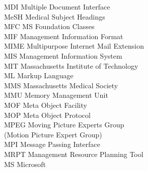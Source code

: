 \begin{tabbing}
    \>MDI \>\>Multiple Document Interface\\

    \>MeSH \>\>Medical Subject Headings\\

    \>MFC \>\>MS Foundation Classes\\

    \>MIF \>\>Management Information Format\\

    \>MIME \>\>Multipurpose Internet Mail Extension\\

    \>MIS \>\>Management Information System\\

    \>MIT \>\>Massachusetts Institute of Technology\\

    \>ML \>\>Markup Language\\

    \>MMS \>\>Massachusetts Medical Society\\

    \>MMU \>\>Memory Management Unit\\

    \>MOF \>\>Meta Object Facility\\

    \>MOP \>\>Meta Object Protocol\\


    \>MPEG \>\>Moving Picture Experts Group\\
        \>\>\>(Motion Picture Expert Group)\\

    \>MPI \>\>Message Passing Interface\\





    \>MRPT \>\>Management Resource Planning Tool\\

    \>MS \>\>Microsoft\\


\end{tabbing}
